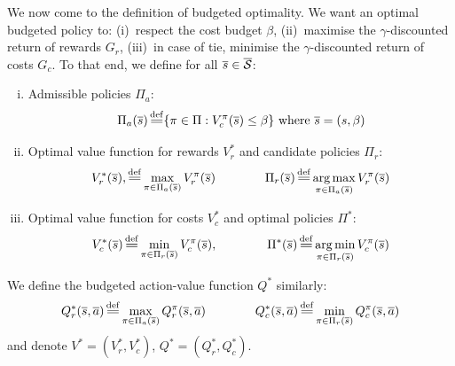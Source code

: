 \documentclass{article}
\begin{document}
\begin{definition}
We now come to the definition of budgeted optimality. We want an optimal budgeted policy to: (i)~respect the cost budget $\beta$, (ii)~maximise the $\gamma$-discounted return of rewards $G_r$, (iii)~in case of tie, minimise the $\gamma$-discounted return of costs $G_c$. To that end, we define for all $\overline{s}\in\overline{\mathcal{S}}$:
\begin{enumerate}[(i)]
    \item Admissible policies $\Pi_a$: 
    \begin{equation}
    \Pi_a(\os) \eqdef \{\pi\in\Pi: V_c^\pi(\os) \leq \beta\}\text{ where }\os = (s, \beta)
    \end{equation}
    \item Optimal value function for rewards $V_r^*$ and candidate policies $\Pi_r$: 
    \begin{equation}
        V_r^*(\os), \eqdef \max_{\pi\in\Pi_a(\os)}  V_r^\pi(\os) \qquad\qquad \Pi_r(\os) \eqdef \argmax_{\pi\in\Pi_a(\os)}  V_r^\pi(\os)
    \end{equation}
    \item Optimal value function for costs $V_c^*$ and optimal policies $\Pi^*$: 
    \begin{equation}
        V_c^*(\os) \eqdef \min_{\pi\in\Pi_r(\os)}  V_c^\pi(\os), \qquad\qquad \Pi^*(\os) \eqdef \argmin_{\pi\in\Pi_r(\os)}  V_c^\pi(\os)
    \end{equation}
\end{enumerate}
We define the budgeted action-value function $Q^*$ similarly:
\begin{equation}
    Q_r^*(\os, \oa) \eqdef \max_{\pi\in\Pi_a(\os)}  Q_r^\pi(\os, \oa) \qquad\qquad Q_c^*(\os, \oa) \eqdef \min_{\pi\in\Pi_r(\os)}  Q_c^\pi(\os, \oa) 
\end{equation}
and denote $V^* = (V_r^*, V_c^*)$, $Q^* = (Q_r^*, Q_c^*)$.
\end{definition}
\end{document}
